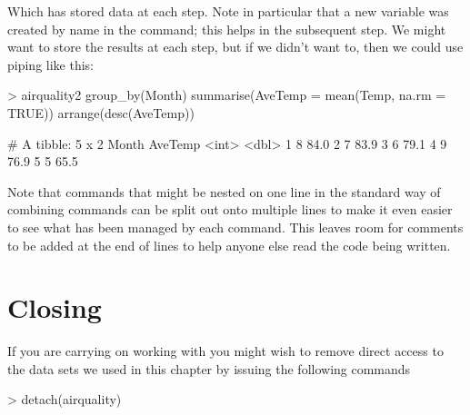 Which has stored data at each step. Note in particular that a new variable was created by name in the  command; this helps in the subsequent  step. We might want to store the results at each step, but if we didn't want to, then we could use piping like this: 

\begin{Schunk}
\begin{Sinput}
> airquality2 %>% 
   group_by(Month) %>% 
   summarise(AveTemp = mean(Temp, na.rm = TRUE))  %>% 
   arrange(desc(AveTemp)) 
\end{Sinput}
\begin{Soutput}
# A tibble: 5 x 2
  Month AveTemp
  <int>   <dbl>
1     8    84.0
2     7    83.9
3     6    79.1
4     9    76.9
5     5    65.5
\end{Soutput}
\end{Schunk}

 
Note that commands that might be nested on one line in the standard way of combining commands can be split out onto multiple lines to make it even easier to see what has been managed by each command. This leaves room for comments to be added at the end of lines to help anyone else read the code being written. 
 
 
\section{Closing} 
 
If you are carrying on working with \R{} you might wish to remove direct access to the data sets we used in this chapter by issuing the following commands 
\begin{Schunk}
\begin{Sinput}
> detach(airquality) 
\end{Sinput}
\end{Schunk}

